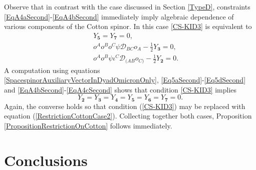 \documentclass[10pt,a4paper]{article}
\theoremstyle{plain}
\begin{document}
Observe that in contrast with the case discussed in Section
  \ref{TypeD}, constraints \eqref{EqA4aSecond}-\eqref{EqA4bSecond}
 immediately imply algebraic dependence of various 
 components of the Cotton spinor.
In this case \eqref{CS-KID3} is equivalent to
\begin{subequations}
\begin{eqnarray}
&& Y_{\bm5}=Y_{\bm7}=0,\\
&& o^{A} o^{B} o^{C} \psi \mathcal{D}_{BC}o_{A}- \tfrac{1}{2} Y_{\bm3}=0,\\
&& o^{A} o^{B} \psi \iota^{C} \mathcal{D}_{(AB}o_{C)}- \tfrac{1}{2} Y_{\bm2}=0.
\end{eqnarray}
\end{subequations}
 A computation using equations
\eqref{SpacespinorAuxiliaryVectorInDyadOmicronOnly},
\eqref{Eq5aSecond}-\eqref{Eq5dSecond} and
\eqref{EqA4bSecond}-\eqref{EqA4cSecond} shows that condition
\eqref{CS-KID3} implies
\begin{equation}\label{RestrictionCottonCase2}
Y_{\bm2}=Y_{\bm3}=Y_{\bm4}=Y_{\bm5}=Y_{\bm6}=Y_{\bm7}=0.
\end{equation}
Again, the converse holds so that condition (\ref{CS-KID3}) may be
replaced with equation (\ref{RestrictionCottonCase2}).  Collecting
together both cases, Proposition \ref{PropositionRestrictionOnCotton}
follows immediately.


\section*{Conclusions}
\end{document}
